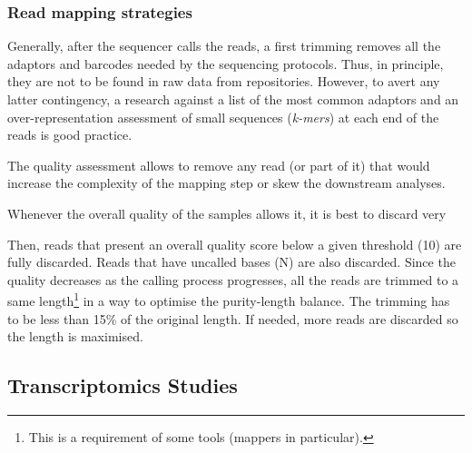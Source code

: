 






\subsubsection{Read mapping strategies}


\NB Generally, after the sequencer calls the reads, a first trimming removes
all the adaptors and barcodes needed by the sequencing protocols. Thus,
in principle, they are not to be found in raw data from repositories.
However, to avert any latter contingency, a research against
a list of the most common adaptors and an over-representation assessment of small
sequences (\emph{k-mers}) at each end of the reads is good practice.







The quality assessment allows to remove any read (or part of it) that would
increase the complexity of the mapping step or skew the downstream analyses.

Whenever the overall quality of the samples allows it, it is best to discard very


Then, reads that present an overall quality score below a given threshold (10) are
fully discarded. Reads that have uncalled bases (\textsc{N}) are also discarded.
Since the quality decreases as the calling process progresses, all the reads are
trimmed to a same length\footnote{This is a requirement of some tools (mappers
in particular).} in a way to optimise the purity-length balance. The trimming has
to be less than 15\% of the original length. If needed, more reads are discarded
so the length is maximised.








\subsection{Transcriptomics Studies}
